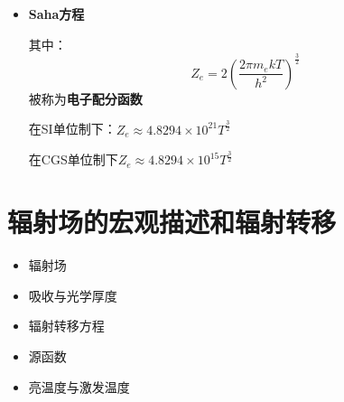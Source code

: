 \documentclass{beamer}
\let\sectiononly\section
\renewcommand{\section}[1]{
    \sectiononly{#1}
    \let\sectiontitle\relax
    \newcommand{\sectiontitle}{#1}
}
\newenvironment{slide}{
    \begin{frame}{\bfseries{\sectiontitle}}
}{
    \end{frame}
}
\begin{document}
\begin{slide}
    \begin{itemize}
        \item \textbf{Saha方程}

        其中：
        \[
            \boxed{
            Z_e = 2\left(\frac{2\pi m_ekT}{h^2}\right)^{\tfrac{3}{2}}
            }
        \]
        被称为\textbf{电子配分函数}

        在SI单位制下：$Z_e\approx4.8294\times10^{21}T^{\tfrac{3}{2}}$

        在CGS单位制下$Z_e\approx4.8294\times10^{15}T^{\tfrac{3}{2}}$
    \end{itemize}
\end{slide}

\section{辐射场的宏观描述和辐射转移}

\begin{slide}
    \begin{itemize}
        \item 辐射场
        \item 吸收与光学厚度
        \item 辐射转移方程
        \item 源函数
        \item 亮温度与激发温度
    \end{itemize}
\end{slide}
\end{document}
